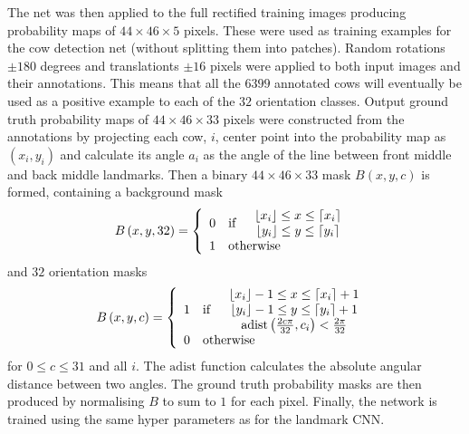 \documentclass{cta-author}
\begin{document}
 The net was then applied to the full rectified training images producing probability maps of $44\times 
46\times 5$ pixels. These were used as training examples for the cow detection net (without splitting them 
into patches). Random rotations $\pm 180$ degrees and translationts $\pm 16$ pixels were applied to both 
input images and their annotations. This means that all the $6399$ annotated cows will eventually be used as 
a positive example to each of the $32$ orientation classes. Output ground truth probability maps of $44\times 
46\times 33$ pixels were constructed from the annotations by projecting each cow, $i$, center point into the 
probability map as $\left( x_i, y_i \right)$ and calculate its angle $a_i$ as the angle of the line between 
front middle and back middle landmarks. Then a binary $44\times 46\times 33$ mask $B\left( x, y, c \right)$ 
is formed, containing a background mask
\begin{equation}
B\left( x, y, 32 \right) = \left\lbrace
\begin{array}{clc}
0 & \text{if} &
\begin{array}{c}
 \lfloor x_i \rfloor \leq x \leq \lceil x_i \rceil \\
 \lfloor y_i \rfloor \leq y \leq \lceil y_i \rceil
\end{array}
\\
1 & \multicolumn{2}{l}{\text{otherwise}}
\end{array}
\right.
\end{equation}
and $32$ orientation masks
\begin{equation}
B\left( x, y, c \right) = \left\lbrace
\begin{array}{clc}
1 & \text{if} &
\begin{array}{c}
 \lfloor x_i \rfloor-1 \leq x \leq \lceil x_i \rceil+1 \\
 \lfloor y_i \rfloor-1 \leq y \leq \lceil y_i \rceil+1 \\
 \mathrm{adist}\left(\frac{2c\pi}{32}, c_i\right) < \frac{2\pi}{32} \\
\end{array}
\\
0 & \multicolumn{2}{l}{\text{otherwise}}
\end{array}
\right.
\end{equation}
for $0\leq c \leq 31$ and all $i$. The $\mathrm{adist}$ function calculates the absolute angular distance 
between two angles. The ground truth probability masks are then produced by normalising $B$ to sum to $1$ for 
each pixel. Finally, the network is trained using the same hyper parameters as for the landmark CNN.
\end{document}
